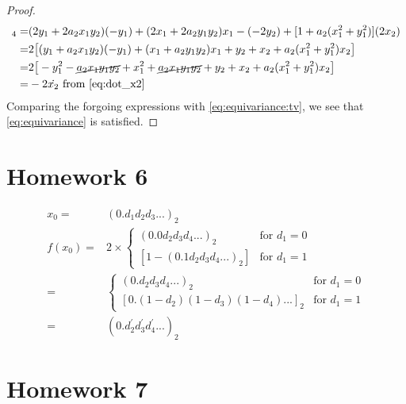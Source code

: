 \documentclass[]{article}
\begin{document}
\begin{proof}
	\begin{align*}
		[A(\vec{x}) t(\vec{x})]_4 =& (2y_1+2a_2x_1y_2)(-y_1) + (2x_1+2a_2y_1y_2)x_1 - (-2 y_2) + [1+a_2(x_1^2+ y_1^2)](2x_2)\\
		=&2\big[(y_1+a_2x_1y_2)(-y_1) + (x_1+a_2y_1y_2)x_1 + y_2 + x_2+a_2(x_1^2+ y_1^2)x_2\big]\\
		=&2\big[-y_1^2 - \cancel{a_2 x_1 y_1 y_2} +x_1^2 +  \cancel{a_2 x_1 y_1 y_2} + y_2 + x_2+ a_2(x_1^2+ y_1^2)x_2\big]\\
		=& -2 \dot{x_2}  \text{ from \eqref{eq:dot_x2}}
	\end{align*}
	Comparing the forgoing expressions with \eqref{eq:equivariance:tv}, we see that \eqref{eq:equivariance} is satisfied.
\end{proof}
\section{Homework 6}

\begin{align*}
	x_0 =& (0.d_1 d_2 d_3 ...)_2\\
	f(x_0) =& 2 \times \begin{cases}
		(0.0 d_2 d_3 d_4...)_2 & \text{for } d_1 = 0\\
		[1- (0.1 d_2 d_3 d_4...)_2] & \text{for } d_1 = 1
	\end{cases}\\
		=& \begin{cases}
			(0.d_2 d_3 d_4...)_2 & \text{for } d_1 = 0\\
			[0.(1-d_2) (1-d_3) (1-d_4)...]_2 & \text{for } d_1 = 1
		\end{cases}\\
	=& (0.d^\prime_2 d^\prime_3 d^\prime_4 ...)_2
\end{align*}
\section{Homework 7}
\end{document}
